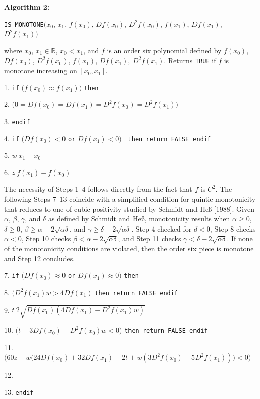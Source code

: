 \begin{plain}
\parskip=0pt
\vskip 5mm
{\parindent 0mm
{\bf Algorithm 2:}

{\tt IS\_MONOTONE}$\bigl(x_0$, $x_1$, $f(x_0)$, $Df(x_0)$,
$D^2f(x_0)$, $f(x_1)$, $Df(x_1)$, $D^2f(x_1) \bigr)$

where $x_0$, $x_1 \in {\mathbb R}$, $x_0 < x_1$, and $f$ is an order six
polynomial defined by $f(x_0)$, $Df(x_0)$, $D^2f(x_0)$, $f(x_1)$,
$Df(x_1)$, $D^2f(x_1)$. Returns {\tt TRUE} if $f$ is monotone
increasing on $[x_0,x_1]$.

}
{\parindent=6mm
\item{1.} {\tt if} $\bigl(f(x_0) \approx f(x_1)\bigr)$ {\tt then}
\item{2.}  $\bigl( 0 = Df(x_0) = Df(x_1)
  = D^2f(x_0) = D^2f(x_1) \bigr)$
\item{3.} {\tt endif}
\item{4.} {\tt if} $\bigl(Df(x_0) < 0$ {\tt or} $Df(x_1) < 0\bigr)$ {\tt
  then return FALSE endif}
\item{5.} $w \: x_1 - x_0$
\item{6.} $z \: f(x_1) - f(x_0)$

\item{} {The necessity of Steps 1--4 follows directly from the
  fact that $f$ is $C^2$. The following Steps 7--13 coincide with a
  simplified condition for quintic monotonicity that reduces to one of
  cubic positivity studied by Schmidt and He{\ss} [1988]. Given
  $\alpha$, $\beta$, $\gamma$, and $\delta$ as defined by Schmidt and
  He{\ss}, monotonicity results when $\alpha \geq 0$, $\delta \geq 0$,
  $\beta \geq \alpha - 2 \sqrt{\alpha \delta}$, and $\gamma \geq
  \delta - 2 \sqrt{\alpha \delta}$.  Step 4 checked for $\delta < 0$,
  Step 8 checks $\alpha < 0$, Step 10 checks $\beta < \alpha - 2
  \sqrt{\alpha \delta}$, and Step 11 checks $\gamma < \delta - 2
  \sqrt{\alpha \delta}$. If none of the monotonicity conditions are
  violated, then the order six piece is monotone and Step 12
  concludes.}

\item{7.} {\tt if} $\bigl(Df(x_0) \approx 0$ {\tt or} $Df(x_1) \approx
0\bigr)$ {\tt then}
\item{8.}  $\bigl(D^2f(x_1)w > 4Df(x_1)$ {\tt then
return FALSE endif}
\item{9.} \codent $t \: 2 \sqrt{Df(x_0) (4Df(x_1) - D^2f(x_1) w) }$
\item{10.}  $\bigl(t + 3Df(x_0) + D^2f(x_0)w < 0 \bigr)$
  {\tt then return FALSE endif}
\item{11.}  $\bigl(60z - w\bigl(24Df(x_0) + 32Df(x_1) - 2t
  + w(3D^2f(x_0) - 5D^2f(x_1))\bigr) < 0\bigr)$
\item{}   \codent {}
\item{12.} 
\item{13.} {\tt endif}

}
\end{plain}
